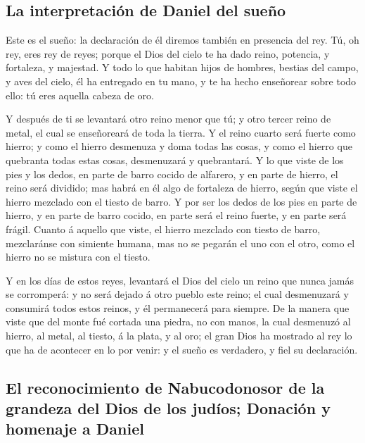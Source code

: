 \hypertarget{la-interpretaciuxf3n-de-daniel-del-sueuxf1o}{%
\subsection{La interpretación de Daniel del
sueño}\label{la-interpretaciuxf3n-de-daniel-del-sueuxf1o}}

 Este es el sueño: la declaración de él diremos también en
presencia del rey.  Tú, oh rey, eres rey de reyes; porque
el Dios del cielo te ha dado reino, potencia, y fortaleza, y majestad.
 Y todo lo que habitan hijos de hombres, bestias del campo,
y aves del cielo, él ha entregado en tu mano, y te ha hecho enseñorear
sobre todo ello: tú eres aquella cabeza de oro.

 Y después de ti se levantará otro reino menor que tú; y
otro tercer reino de metal, el cual se enseñoreará de toda la tierra.
 Y el reino cuarto será fuerte como hierro; y como el
hierro desmenuza y doma todas las cosas, y como el hierro que quebranta
todas estas cosas, desmenuzará y quebrantará.  Y lo que
viste de los pies y los dedos, en parte de barro cocido de alfarero, y
en parte de hierro, el reino será dividido; mas habrá en él algo de
fortaleza de hierro, según que viste el hierro mezclado con el tiesto de
barro.  Y por ser los dedos de los pies en parte de hierro,
y en parte de barro cocido, en parte será el reino fuerte, y en parte
será frágil.  Cuanto á aquello que viste, el hierro
mezclado con tiesto de barro, mezclaránse con simiente humana, mas no se
pegarán el uno con el otro, como el hierro no se mistura con el tiesto.

 Y en los días de estos reyes, levantará el Dios del cielo
un reino que nunca jamás se corromperá: y no será dejado á otro pueblo
este reino; el cual desmenuzará y consumirá todos estos reinos, y él
permanecerá para siempre.  De la manera que viste que del
monte fué cortada una piedra, no con manos, la cual desmenuzó al hierro,
al metal, al tiesto, á la plata, y al oro; el gran Dios ha mostrado al
rey lo que ha de acontecer en lo por venir: y el sueño es verdadero, y
fiel su declaración.

\hypertarget{el-reconocimiento-de-nabucodonosor-de-la-grandeza-del-dios-de-los-juduxedos-donaciuxf3n-y-homenaje-a-daniel}{%
\subsection{El reconocimiento de Nabucodonosor de la grandeza del Dios
de los judíos; Donación y homenaje a
Daniel}\label{el-reconocimiento-de-nabucodonosor-de-la-grandeza-del-dios-de-los-juduxedos-donaciuxf3n-y-homenaje-a-daniel}}

